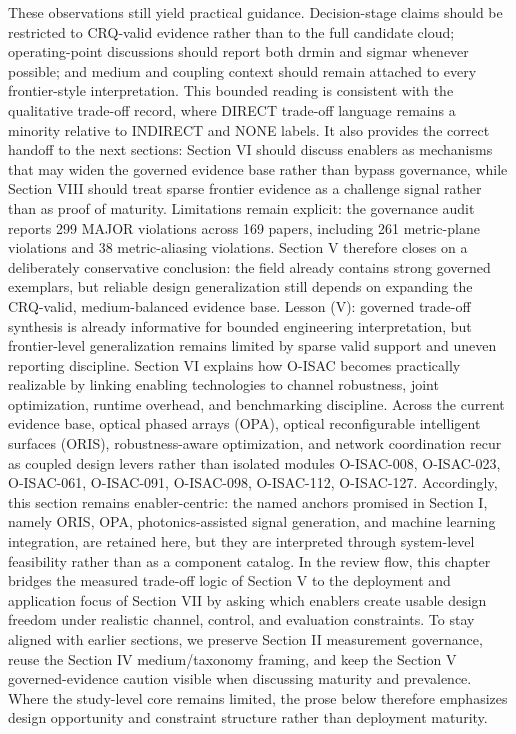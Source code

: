 {}These observations still yield practical guidance. Decision-stage claims should be restricted to CRQ-valid evidence rather than to the full candidate cloud; operating-point discussions should report both drmin and sigma\markdownRendererUnderscore{}r whenever possible; and medium and coupling context should remain attached to every frontier-style interpretation. This bounded reading is consistent with the qualitative trade-off record, where DIRECT trade-off language remains a minority relative to INDIRECT and NONE labels. It also provides the correct handoff to the next sections: Section VI should discuss enablers as mechanisms that may widen the governed evidence base rather than bypass governance, while Section VIII should treat sparse frontier evidence as a challenge signal rather than as proof of maturity. Limitations remain explicit: the governance audit reports 299 MAJOR violations across 169 papers, including 261 metric-plane violations and 38 metric-aliasing violations. Section V therefore closes on a deliberately conservative conclusion: the field already contains strong governed exemplars, but reliable design generalization still depends on expanding the CRQ-valid, medium-balanced evidence base.\markdownRendererParagraphSeparator
{}Lesson (V): governed trade-off synthesis is already informative for bounded engineering interpretation, but frontier-level generalization remains limited by sparse valid support and uneven reporting discipline.\markdownRendererInterblockSeparator
{}
\markdownRendererSectionEnd 
\markdownRendererSectionEnd \markdownRendererSectionBegin
{}\markdownRendererInterblockSeparator
{}Section VI explains how O-ISAC becomes practically realizable by linking enabling technologies to channel robustness, joint optimization, runtime overhead, and benchmarking discipline. Across the current evidence base, optical phased arrays (OPA), optical reconfigurable intelligent surfaces (ORIS), robustness-aware optimization, and network coordination recur as coupled design levers rather than isolated modules O-ISAC-008, O-ISAC-023, O-ISAC-061, O-ISAC-091, O-ISAC-098, O-ISAC-112, O-ISAC-127. Accordingly, this section remains enabler-centric: the named anchors promised in Section I, namely ORIS, OPA, photonics-assisted signal generation, and machine learning integration, are retained here, but they are interpreted through system-level feasibility rather than as a component catalog. In the review flow, this chapter bridges the measured trade-off logic of Section V to the deployment and application focus of Section VII by asking which enablers create usable design freedom under realistic channel, control, and evaluation constraints. To stay aligned with earlier sections, we preserve Section II measurement governance, reuse the Section IV medium/taxonomy framing, and keep the Section V governed-evidence caution visible when discussing maturity and prevalence. Where the study-level core remains limited, the prose below therefore emphasizes design opportunity and constraint structure rather than deployment maturity.\markdownRendererParagraphSeparator
